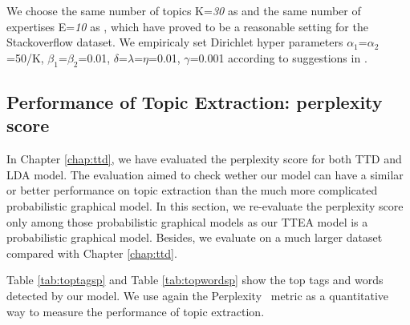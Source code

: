 {{{{{{{\begin{itemize}
\end{itemize}


We choose the same number of topics K=\textit{30} as \cite{Chang:2013} and the same number of expertises E=\textit{10} as \cite{yang2013cqarank}, which have proved to be a reasonable setting for the Stackoverflow dataset. We empiricaly set Dirichlet hyper parameters $\alpha_1$=$\alpha_2$=50/K, $\beta_1$=$\beta_2$=0.01, $\delta$=$\lambda$=$\eta$=0.01, $\gamma$=0.001 according to suggestions in \cite{griffiths2004finding}. 


\subsection{Performance of Topic Extraction: perplexity score}


In Chapter \ref{chap:ttd}, we have evaluated the perplexity score for both TTD and LDA model. The evaluation aimed to check wether our model can have a similar or better performance on topic extraction than the much more complicated probabilistic graphical model. In this section, we re-evaluate the perplexity score only among those probabilistic graphical models as our TTEA model is a probabilistic graphical model. Besides, we evaluate on a much larger dataset compared with Chapter \ref{chap:ttd}.

Table \ref{tab:toptagsp} and Table \ref{tab:topwordsp} show the top tags and words detected by our model. We use again the Perplexity~\cite{blei2003latent} metric as a quantitative way to measure the performance of topic extraction.

}}}}}}}
